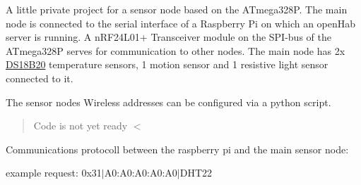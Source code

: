 A little private project for a sensor node based on the A\+Tmega328P. The main node is connected to the serial interface of a Raspberry Pi on which an open\+Hab server is running. A n\+R\+F24\+L01+ Transceiver module on the S\+P\+I-\/bus of the A\+Tmega328P serves for communication to other nodes. The main node has 2x \hyperlink{classDS18B20}{D\+S18\+B20} temperature sensors, 1 motion sensor and 1 resistive light sensor connected to it.

The sensor nodes Wireless addresses can be configured via a python script.

\begin{quote}
Code is not yet ready $<$ \end{quote}


Communications protocoll between the raspberry pi and the main sensor node\+:

example request\+: 0x31$\vert$\+A0\+:A0\+:\+A0\+:\+A0\+:A0$\vert$\+D\+H\+T22

